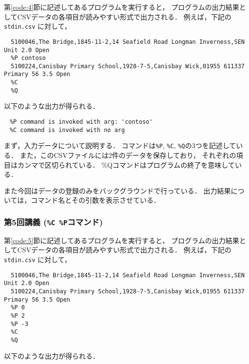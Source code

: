 \documentclass[autodetect-engine,dvi=dvipdfmx,ja=standard,
               a4j,11pt]{bxjsarticle}
\begin{document}
第\ref{code:4}節に記述してあるプログラムを実行すると，
プログラムの出力結果としてCSVデータの各項目が読みやすい形式で出力される．
例えば，下記の \verb|stdin.csv| に対して，

{\fontsize{10pt}{11pt} \selectfont
 \begin{verbatim}
  5100046,The Bridge,1845-11-2,14 Seafield Road Longman Inverness,SEN Unit 2.0 Open
  %P contoso
  5100224,Canisbay Primary School,1928-7-5,Canisbay Wick,01955 611337 Primary 56 3.5 Open
  %C
  %Q
 \end{verbatim}
}

\noindent
以下のような出力が得られる．

{\fontsize{10pt}{11pt} \selectfont
 \begin{verbatim}
　%P command is invoked with arg: 'contoso'
　%C command is invoked with no arg
 \end{verbatim}
}

まず，入力データについて説明する．
コマンドは\verb|%P|, \verb|%C|, \verb|%Q|の3つを記述している．
また，このCSVファイルには2件のデータを保存しており，
それぞれの項目はカンマで区切られている．
\%Qコマンドはプログラムの終了を意味している．

また今回はデータの登録のみをバックグラウンドで行っている．
出力結果については，コマンド名とその引数を表示させている．

\subsubsection{第5回講義 (\texttt{\%C \%P}コマンド)}

第\ref{code:5}節に記述してあるプログラムを実行すると，
プログラムの出力結果としてCSVデータの各項目が読みやすい形式で出力される．
例えば，下記の \verb|stdin.csv| に対して，

{\fontsize{10pt}{11pt} \selectfont
 \begin{verbatim}
  5100046,The Bridge,1845-11-2,14 Seafield Road Longman Inverness,SEN Unit 2.0 Open
  5100224,Canisbay Primary School,1928-7-5,Canisbay Wick,01955 611337 Primary 56 3.5 Open
  %P 0
  %P 2
  %P -3
  %C
  %Q
 \end{verbatim}
}

\noindent
以下のような出力が得られる．
\end{document}

